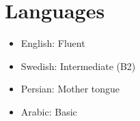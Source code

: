 \newpage
\section*{Languages}{}

\begin{itemize}[]
\item English: Fluent
\item Swedish: Intermediate (B2)
\item Persian: Mother tongue
\item Arabic: Basic
\end{itemize}

